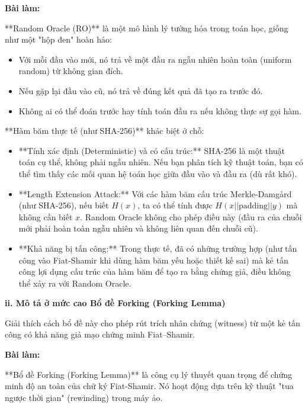 \textbf{Bài làm:}

**Random Oracle (RO)** là một mô hình lý tưởng hóa trong toán học, giống như một "hộp đen" hoàn hảo:
\begin{itemize}
    \item Với mỗi đầu vào mới, nó trả về một đầu ra ngẫu nhiên hoàn toàn (uniform random) từ không gian đích.
    \item Nếu gặp lại đầu vào cũ, nó trả về đúng kết quả đã tạo ra trước đó.
    \item Không ai có thể đoán trước hay tính toán đầu ra nếu không thực sự gọi hàm.
\end{itemize}

**Hàm băm thực tế (như SHA-256)** khác biệt ở chỗ:
\begin{itemize}
    \item **Tính xác định (Deterministic) và có cấu trúc:** SHA-256 là một thuật toán cụ thể, không phải ngẫu nhiên. Nếu bạn phân tích kỹ thuật toán, bạn có thể tìm thấy các mối quan hệ toán học giữa đầu vào và đầu ra (dù rất khó).
    \item **Length Extension Attack:** Với các hàm băm cấu trúc Merkle-Damg\aa rd (như SHA-256), nếu biết $H(x)$, ta có thể tính được $H(x || \text{padding} || y)$ mà không cần biết $x$. Random Oracle không cho phép điều này (đầu ra của chuỗi mới phải hoàn toàn ngẫu nhiên và không liên quan đến chuỗi cũ).
    \item **Khả năng bị tấn công:** Trong thực tế, đã có những trường hợp (như tấn công vào Fiat-Shamir khi dùng hàm băm yếu hoặc thiết kế sai) mà kẻ tấn công lợi dụng cấu trúc của hàm băm để tạo ra bằng chứng giả, điều không thể xảy ra với Random Oracle.
\end{itemize}

\textbf{ii. Mô tả ở mức cao Bổ đề Forking (Forking Lemma)}

Giải thích cách bổ đề này cho phép rút trích nhân chứng (witness) từ một kẻ tấn công có khả năng giả mạo chứng minh Fiat–Shamir.

\textbf{Bài làm:}

**Bổ đề Forking (Forking Lemma)** là công cụ lý thuyết quan trọng để chứng minh độ an toàn của chữ ký Fiat-Shamir. Nó hoạt động dựa trên kỹ thuật "tua ngược thời gian" (rewinding) trong máy ảo.

